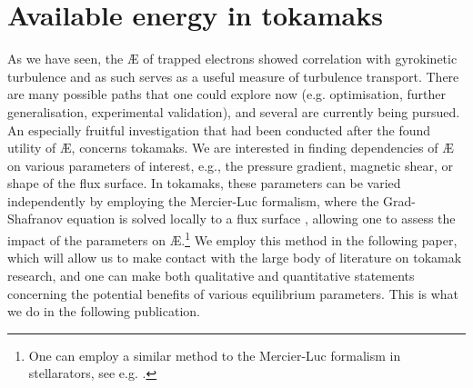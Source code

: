 \chapter[Available energy in tokamaks]{Available energy in tokamaks}
\label{chap: AE-TE}
As we have seen, the \AE{} of trapped electrons showed correlation with gyrokinetic turbulence and as such serves as a useful measure of turbulence transport. There are many possible paths that one could explore now (e.g. optimisation, further generalisation, experimental validation), and several are currently being pursued. An especially fruitful investigation that had been conducted after the found utility of \AE{}, concerns tokamaks. We are interested in finding dependencies of \AE{} on various parameters of interest, e.g., the pressure gradient, magnetic shear, or shape of the flux surface. In tokamaks, these parameters can be varied independently by employing the Mercier-Luc formalism, where the Grad-Shafranov equation is solved locally to a flux surface \cite{MercierLuc1974}, allowing one to assess the impact of the parameters on \AE{}.\footnote{One can employ a similar method to the Mercier-Luc formalism in stellarators, see e.g. \citet{hegna2000local}.} We employ this method in the following paper, which will allow us to make contact with the large body of literature on tokamak research, and one can make both qualitative and quantitative statements concerning the potential benefits of various equilibrium parameters. This is what we do in the following publication.
\vfill \newpage